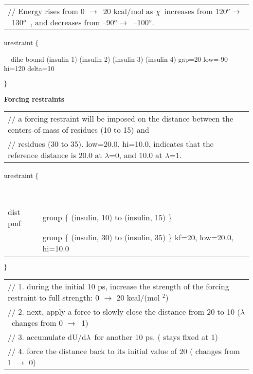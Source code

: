 \begin{tabular}{l}
{\footnotesize // Energy rises from 0 }$\rightarrow ${\footnotesize \ 20
kcal/mol as }$\chi ${\footnotesize \ {}increases from 120}$^{o}\rightarrow $%
{\footnotesize \ 130}$^{o}${\footnotesize \ , and decreases from --90}$%
^{o}\rightarrow ${\footnotesize \ --100}$^{o}${\footnotesize .}
\end{tabular}

urestraint $\{$

~~dihe bound (insulin 1) (insulin 2) (insulin 3) (insulin 4) gap=20 low=-90
hi=120 delta=10

$\}$

{\bf Forcing restraints}

\begin{tabular}{l}
{\footnotesize // a forcing restraint will be imposed on the distance
between the centers-of-mass of residues (10 to 15) and} \\ 
{\footnotesize // residues (30 to 35). low=20.0, hi=10.0, indicates that the
reference distance is 20.0%
at }$\lambda ${\footnotesize =0, and 10.0%
at }$\lambda ${\footnotesize =1.}
\end{tabular}

urestraint $\{$

~~
\begin{tabular}{ll}
dist pmf & group $\{$ (insulin, 10) to (insulin, 15) $\}$ \\ 
& \hspace{0pt}group $\{$ (insulin, 30) to (insulin, 35) $\}$ kf=20,
low=20.0, hi=10.0
\end{tabular}

$\}\medskip $

\begin{tabular}{l}
{\footnotesize // 1. during the initial 10 ps, increase the strength of the
forcing restraint to full strength: 0 }$\rightarrow $ {\footnotesize 20
kcal/(mol %
}$^{2}${\footnotesize )} \\ 
{\footnotesize // 2. next, apply a force to slowly close the distance from
20 %
to 10 %
(}$\lambda ${\footnotesize \ changes from 0 }$\rightarrow ${\footnotesize \
1)} \\ 
{\footnotesize // 3. accumulate dU/d}$\lambda ${\footnotesize \ for another
10 ps. ( stays fixed at 1)} \\ 
{\footnotesize // 4. force the distance back to its initial value of 20 
( changes from 1 }$\rightarrow $ {\footnotesize 0)}
\end{tabular}

